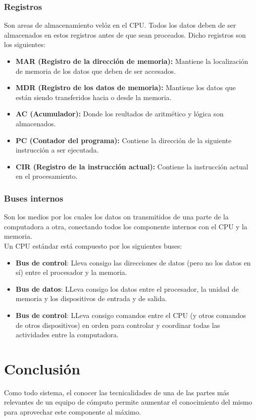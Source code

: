\documentclass[letterpaper, 12pt]{article}
\begin{document}
\begin{justify}
        \subsubsection*{Registros}
        \justify
        Son areas de almacenamiento velóz en el CPU. Todos los datos deben de ser almacenados en estos registros antes de que sean proceados.
        Dicho registros son los siguientes:
        \begin{itemize}
            \item \textbf{MAR (Registro de la dirección de memoria):} Mantiene la localización de memoria de los datos que deben de ser accesados.
            \item \textbf{MDR (Registro de los datos de memoria):} Mantiene los datos que están siendo transferidos hacia o desde la memoria.
            \item \textbf{AC (Acumulador):} Donde los reultados de aritmético y lógica son almacenados.
            \item \textbf{PC (Contador del programa):} Contiene la dirección de la siguiente instrucción a ser ejecutada.
            \item \textbf{CIR (Registro de la instrucción actual):} Contiene la instrucción actual en el procesamiento.
        \end{itemize}
        \subsubsection*{Buses internos}
        \justify
        Son los medios por los cuales los datos on transmitidos de una parte de la computadora a otra, conectando todos los componente internos con el CPU y la memoria.
        \\\newline
        Un CPU estándar está compuesto por los siguientes buses:
        \begin{itemize}
            \item \textbf{Bus de control}: Lleva consigo las direcciones de datos (pero no los datos en sí) entre el procesador y la memoria.
            \item \textbf{Bus de datos}: LLeva consigo los datos entre el procesador, la unidad de memoria y los dispositivos de entrada y de salida.
            \item \textbf{Bus de control}: LLeva consigo comandos entre el CPU (y otros comandos de otros dispositivos) en orden para controlar y coordinar todas las actividades entre la computadora.
        \end{itemize}
        \section{Conclusión}
        \justify
        Como todo sistema, el conocer las tecnicalidades de una de las partes más relevantes de un equipo de cómputo permite aumentar el conocimiento del mismo para aprovechar este componente
        al máximo.

    \end{justify}
\end{document}
